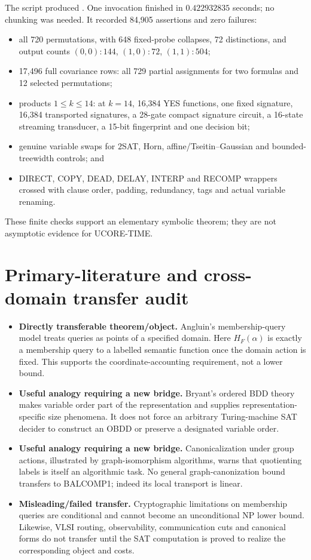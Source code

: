 \documentclass[11pt]{article}
\begin{document}
The script
 produced
.  One invocation
finished in $0.422932835$ seconds; no chunking was needed.  It recorded 84,905 assertions
and zero failures:
\begin{itemize}
\item all 720 permutations, with 648 fixed-probe collapses, 72 distinctions, and output
counts $(0,0):144$, $(1,0):72$, $(1,1):504$;
\item 17,496 full covariance rows: all 729 partial assignments for two formulas and
12 selected permutations;
\item products $1\le k\le14$: at $k=14$, 16,384 YES functions, one fixed signature,
16,384 transported signatures, a 28-gate compact signature circuit, a 16-state streaming
transducer, a 15-bit fingerprint and one decision bit;
\item genuine variable swaps for $2$SAT, Horn, affine/Tseitin--Gaussian and
bounded-treewidth controls; and
\item DIRECT, COPY, DEAD, DELAY, INTERP and RECOMP wrappers crossed with clause order,
padding, redundancy, tags and actual variable renaming.
\end{itemize}
These finite checks support an elementary symbolic theorem; they are not asymptotic
evidence for UCORE-TIME.

\section{Primary-literature and cross-domain transfer audit}

\begin{itemize}
\item \textbf{Directly transferable theorem/object.}  Angluin's membership-query model
treats queries as points of a specified domain.  Here $H_F(\alpha)$ is exactly a
membership query to a labelled semantic function once the domain action is fixed.  This
supports the coordinate-accounting requirement, not a lower bound.
\item \textbf{Useful analogy requiring a new bridge.}  Bryant's ordered BDD theory makes
variable order part of the representation and supplies representation-specific size
phenomena.  It does not force an arbitrary Turing-machine SAT decider to construct an
OBDD or preserve a designated variable order.
\item \textbf{Useful analogy requiring a new bridge.}  Canonicalization under group
actions, illustrated by graph-isomorphism algorithms, warns that quotienting labels is
itself an algorithmic task.  No general graph-canonization bound transfers to BALCOMP1;
indeed its local transport is linear.
\item \textbf{Misleading/failed transfer.}  Cryptographic limitations on membership
queries are conditional and cannot become an unconditional NP lower bound.  Likewise,
VLSI routing, observability, communication cuts and canonical forms do not transfer until
the SAT computation is proved to realize the corresponding object and costs.
\end{itemize}
\end{document}
